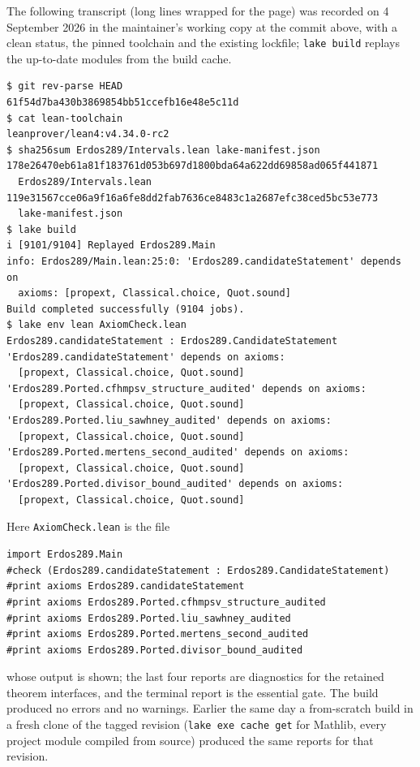 \documentclass[11pt,letterpaper]{article}
\numberwithin{equation}{section}
\theoremstyle{plain}
\theoremstyle{remark}
\begin{document}
The following transcript (long lines wrapped for the page) was recorded on 4 September 2026 in the maintainer's working copy at the commit above, with a clean status, the pinned toolchain and the existing lockfile; \texttt{lake build} replays the up-to-date modules from the build cache.
\begin{verbatim}
$ git rev-parse HEAD
61f54d7ba430b3869854bb51ccefb16e48e5c11d
$ cat lean-toolchain
leanprover/lean4:v4.34.0-rc2
$ sha256sum Erdos289/Intervals.lean lake-manifest.json
178e26470eb61a81f183761d053b697d1800bda64a622dd69858ad065f441871
  Erdos289/Intervals.lean
119e31567cce06a9f16a6fe8dd2fab7636ce8483c1a2687efc38ced5bc53e773
  lake-manifest.json
$ lake build
i [9101/9104] Replayed Erdos289.Main
info: Erdos289/Main.lean:25:0: 'Erdos289.candidateStatement' depends on
  axioms: [propext, Classical.choice, Quot.sound]
Build completed successfully (9104 jobs).
$ lake env lean AxiomCheck.lean
Erdos289.candidateStatement : Erdos289.CandidateStatement
'Erdos289.candidateStatement' depends on axioms:
  [propext, Classical.choice, Quot.sound]
'Erdos289.Ported.cfhmpsv_structure_audited' depends on axioms:
  [propext, Classical.choice, Quot.sound]
'Erdos289.Ported.liu_sawhney_audited' depends on axioms:
  [propext, Classical.choice, Quot.sound]
'Erdos289.Ported.mertens_second_audited' depends on axioms:
  [propext, Classical.choice, Quot.sound]
'Erdos289.Ported.divisor_bound_audited' depends on axioms:
  [propext, Classical.choice, Quot.sound]
\end{verbatim}
Here \texttt{AxiomCheck.lean} is the file
\begin{verbatim}
import Erdos289.Main
#check (Erdos289.candidateStatement : Erdos289.CandidateStatement)
#print axioms Erdos289.candidateStatement
#print axioms Erdos289.Ported.cfhmpsv_structure_audited
#print axioms Erdos289.Ported.liu_sawhney_audited
#print axioms Erdos289.Ported.mertens_second_audited
#print axioms Erdos289.Ported.divisor_bound_audited
\end{verbatim}
whose output is shown; the last four reports are diagnostics for the retained theorem interfaces, and the terminal report is the essential gate. The build produced no errors and no warnings. Earlier the same day a from-scratch build in a fresh clone of the tagged revision (\texttt{lake exe cache get} for Mathlib, every project module compiled from source) produced the same reports for that revision.
\end{document}
